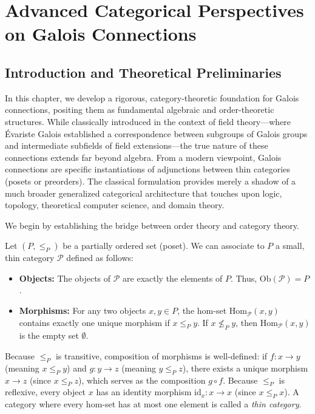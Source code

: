 \chapter{Advanced Categorical Perspectives on Galois Connections}
\label{ch:galois_connections}

\section{Introduction and Theoretical Preliminaries}

In this chapter, we develop a rigorous, category-theoretic foundation for Galois connections, positing them as fundamental algebraic and order-theoretic structures. While classically introduced in the context of field theory---where Évariste Galois established a correspondence between subgroups of Galois groups and intermediate subfields of field extensions---the true nature of these connections extends far beyond algebra. From a modern viewpoint, Galois connections are specific instantiations of adjunctions between thin categories (posets or preorders). The classical formulation provides merely a shadow of a much broader generalized categorical architecture that touches upon logic, topology, theoretical computer science, and domain theory.

We begin by establishing the bridge between order theory and category theory.

\begin{definition}
Let $(P, \leq_P)$ be a partially ordered set (poset). We can associate to $P$ a small, thin category $\mathcal{P}$ defined as follows:
\begin{itemize}
    \item \textbf{Objects:} The objects of $\mathcal{P}$ are exactly the elements of $P$. Thus, $\text{Ob}(\mathcal{P}) = P$.
    \item \textbf{Morphisms:} For any two objects $x, y \in P$, the hom-set $\text{Hom}_{\mathcal{P}}(x, y)$ contains exactly one unique morphism if $x \leq_P y$. If $x \not\leq_P y$, then $\text{Hom}_{\mathcal{P}}(x, y)$ is the empty set $\emptyset$.
\end{itemize}
Because $\leq_P$ is transitive, composition of morphisms is well-defined: if $f: x \to y$ (meaning $x \leq_P y$) and $g: y \to z$ (meaning $y \leq_P z$), there exists a unique morphism $x \to z$ (since $x \leq_P z$), which serves as the composition $g \circ f$. Because $\leq_P$ is reflexive, every object $x$ has an identity morphism $\text{id}_x: x \to x$ (since $x \leq_P x$). A category where every hom-set has at most one element is called a \emph{thin category}.
\end{definition}

